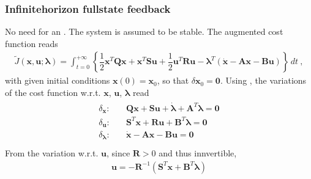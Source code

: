 \documentclass[letterpaper,10pt,english]{jupyterBook}
\begin{document}
\subsubsection{Infinite\sphinxhyphen{}horizon full\sphinxhyphen{}state feedback}
\label{\detokenize{ch/control/optimal-control-full-state-old:infinite-horizon-full-state-feedback}}\label{\detokenize{ch/control/optimal-control-full-state-old:control-optimal-full-state-fb-lti-infinite-time}}
\sphinxAtStartPar
No need for an . The system is assumed to be stable. The augmented cost function reads
\begin{equation*}
\begin{split}\widetilde{J}(\mathbf{x}, \mathbf{u}; \boldsymbol{\lambda}) = \int_{t=0}^{+\infty} \left\{ \dfrac{1}{2} \mathbf{x}^T \mathbf{Q} \mathbf{x} + \mathbf{x}^T \mathbf{S} \mathbf{u} + \dfrac{1}{2} \mathbf{u}^T \mathbf{R} \mathbf{u} - \boldsymbol{\lambda}^T (\dot{\mathbf{x}} - \mathbf{A} \mathbf{x} - \mathbf{B}  \mathbf{u} ) \right\} \, dt \ ,\end{split}
\end{equation*}
\sphinxAtStartPar
with given initial conditions \(\mathbf{x}(0) = \mathbf{x}_0\), so that \(\delta \mathbf{x}_0 = \mathbf{0}\).
Using {\hyperref[\detokenize{ch/calculus-variations/intro:calculus-variations-intro}]{}}, the variations of the cost function w.r.t. \(\mathbf{x}\), \(\mathbf{u}\), \(\boldsymbol{\lambda}\) read
\begin{equation*}
\begin{split}\begin{aligned}
 \delta_{\mathbf{x}}           : & \quad  \mathbf{Q} \mathbf{x} + \mathbf{S} \mathbf{u} + \dot{\boldsymbol{\lambda}} + \mathbf{A}^T \boldsymbol{\lambda} = \mathbf{0} \\
 \delta_{\mathbf{u}}           : & \quad  \mathbf{S}^T \mathbf{x} + \mathbf{R} \mathbf{u} + \mathbf{B}^T \boldsymbol{\lambda} = \mathbf{0} \\
 \delta_{\boldsymbol{\lambda}} : & \quad  \dot{\mathbf{x}} - \mathbf{A} \mathbf{x} - \mathbf{B} \mathbf{u} = \mathbf{0} \\
\end{aligned}\end{split}
\end{equation*}
\sphinxAtStartPar
From the variation w.r.t. \(\mathbf{u}\), since \(\mathbf{R} > 0\) and thus innvertible,
\begin{equation*}
\begin{split}\mathbf{u} = - \mathbf{R}^{-1} \left( \mathbf{S}^T \mathbf{x} + \mathbf{B}^T \boldsymbol{\lambda} \right)\end{split}
\end{equation*}
\end{document}
